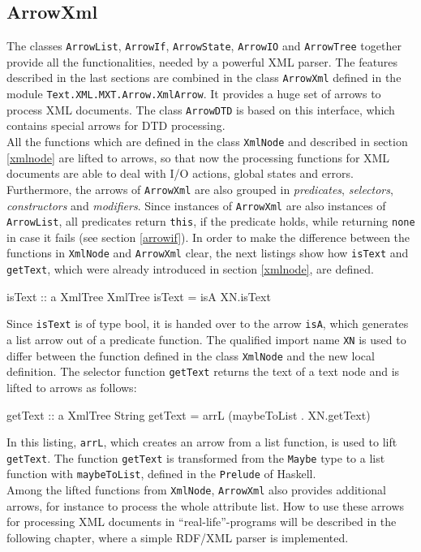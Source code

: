 \documentclass[11pt,a4paper,headsepline, bibtotoc]{scrreprt}
\begin{document}
\subsection{ArrowXml}
The classes \texttt{ArrowList}, \texttt{ArrowIf}, \texttt{ArrowState}, \texttt{ArrowIO} and \texttt{ArrowTree} together provide all the functionalities, needed by a powerful XML parser. The features described in the last sections are combined in the class \texttt{ArrowXml} defined in the module \texttt{Text.XML.MXT.Ar\-row.XmlArrow}. It provides a huge set of arrows to process XML documents.  The class \texttt{ArrowDTD} is based on this interface, which contains special arrows for DTD processing.\\ 
All the functions which are defined in the class \texttt{XmlNode} and described in section \ref{xmlnode} are lifted to arrows, so that now the processing functions for XML documents are able to deal with I/O actions, global states and errors. Furthermore, the arrows of \texttt{ArrowXml} are also grouped in \textit{predicates}, \textit{selectors}, \textit{constructors} and \textit{modifiers}. Since instances of \texttt{ArrowXml} are also instances of \texttt{ArrowList}, all predicates return \texttt{this}, if the predicate holds, while returning \texttt{none} in case it fails (see section \ref{arrowif}). In order to make the difference between the functions in \texttt{XmlNode} and \texttt{ArrowXml} clear, the next listings show how \texttt{isText} and \texttt{getText}, which were already introduced in section \ref{xmlnode}, are defined. 
\begin{code}
isText  :: a XmlTree XmlTree
isText  = isA XN.isText
\end{code}  
Since \texttt{isText} is of type bool, it is handed over to the arrow \texttt{isA}, which generates a list arrow out of a predicate function. The qualified import name \texttt{XN} is used to differ between the function defined in the class \texttt{XmlNode} and the new local definition. The selector function \texttt{getText} returns the text of a text node and is lifted to arrows as follows:
\begin{code}
getText :: a XmlTree String
getText = arrL (maybeToList  . XN.getText)
\end{code}
In this listing, \texttt{arrL}, which creates an arrow from a list function, is used to lift \texttt{getText}. The function \texttt{getText} is transformed from the \texttt{Maybe} type to a list function with \texttt{maybeToList}, defined in the \texttt{Prelude} of Haskell.\\
Among the lifted functions from \texttt{XmlNode}, \texttt{ArrowXml} also provides additional arrows, for instance to process the whole attribute list. How to use these arrows for processing XML documents in ``real-life''-programs will be described in the following chapter, where a simple RDF/XML parser is implemented.
\end{document}
